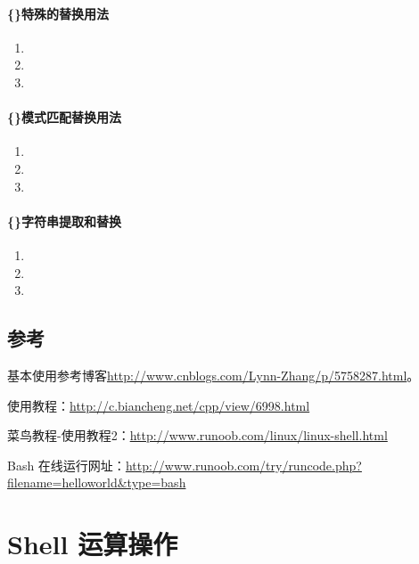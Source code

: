 \documentclass[UTF8,a4paper,12pt]{ctexbook}
\begin{document}
				\paragraph{\{\}特殊的替换用法}
				\begin{enumerate}
					\item 
					
					\item 
					
					\item 
				\end{enumerate}
				\paragraph{\{\}模式匹配替换用法}
				\begin{enumerate}
					\item 
					
					\item 
					
					\item 
				\end{enumerate}
				\paragraph{\{\}字符串提取和替换}
				\begin{enumerate}
					\item 
					
					\item 
					
					\item 
				\end{enumerate}
	    \subsection{参考}基本使用参考博客\url{http://www.cnblogs.com/Lynn-Zhang/p/5758287.html}。
		 
			 使用教程：\url{http://c.biancheng.net/cpp/view/6998.html}
			 
			 菜鸟教程-使用教程2：\url{http://www.runoob.com/linux/linux-shell.html}
			 
			 Bash 在线运行网址：\url{http://www.runoob.com/try/runcode.php?filename=helloworld&type=bash}

	 \section{Shell 运算操作}
\end{document}
